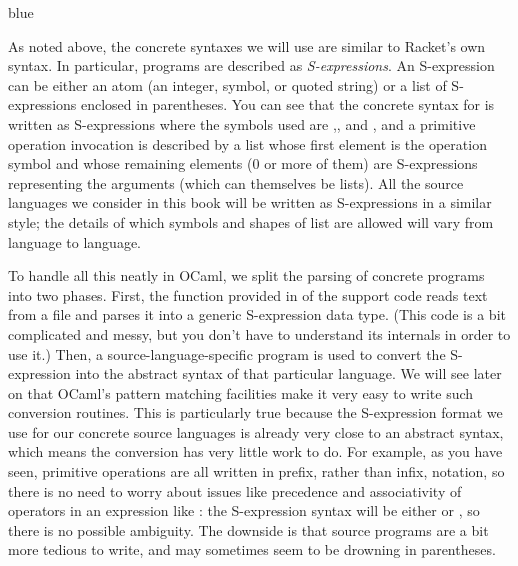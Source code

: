 \documentclass[11pt]{book}
\newenvironment{ocamlx}{
  \begin{color}{blue}
}
{
  \end{color}
}
\begin{document}
\begin{ocamlx}
  As noted above, the concrete syntaxes we will use are similar to Racket's own syntax.
  In particular, programs are described as \emph{S-expressions}. An S-expression can be
  either an atom (an integer, symbol, or quoted string) or a list of S-expressions enclosed in
  parentheses.  You can see that the concrete syntax for \LangInt{} is written as
  S-expressions where the symbols used are ,\code{-}, and \code{+}, and
  a primitive operation invocation is described by a list whose first element is
  the operation symbol and whose remaining elements (0 or more of them) are
  S-expressions representing the arguments (which can themselves be lists).
  All the source languages we consider in this book will be written as S-expressions in
  a similar style;  the details of which symbols and shapes of list are allowed
  will vary from language to language.
  
  To handle all this neatly in OCaml, we split the parsing of concrete
  programs into two phases. First, the  function provided
  in  of the support code reads text from a file and
  parses it into a generic S-expression data type.  (This code is a
  bit complicated and messy, but you don't have to understand its
  internals in order to use it.) Then, a source-language-specific
  program is used to convert the S-expression into the abstract syntax
  of that particular language. We will see later on that OCaml's pattern
  matching facilities make it very easy to write such conversion
  routines.  This is particularly true because the S-expression format
  we use for our concrete source languages is already very close to an
  abstract syntax, which means the conversion has very little work to
  do.  For example, as you have seen, primitive operations are all
  written in prefix, rather than infix, notation, so there is no need
  to worry about issues like precedence and associativity of operators
  in an expression like : the S-expression syntax
  will be either  or , so
  there is no possible ambiguity. The downside is that source programs
  are a bit more tedious to write, and may sometimes seem to be drowning in
  parentheses.


\end{ocamlx}
\end{document}
